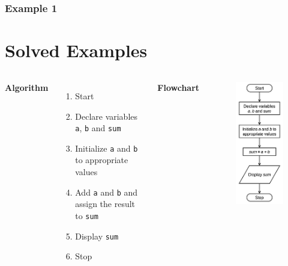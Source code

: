 \documentclass{beamer}
\begin{document}
\begin{frame}[fragile]
    \frametitle{Example 1}
    \section{Solved Examples} %
    \label{sec:solved}
    \begin{columns}
    \textbf{Algorithm}
    \begin{enumerate}
        \item Start
        \item Declare variables \texttt{a}, \texttt{b} and \texttt{sum}
        \item Initialize \texttt{a} and \texttt{b} to appropriate values
        \item Add \texttt{a} and \texttt{b} and assign the result to \texttt{sum}
        \item Display \texttt{sum}
        \item Stop
    \end{enumerate}
    \textbf{Flowchart}
    \begin{figure}
        \centering
        \includegraphics[scale=0.55]{p1flow}
    \end{figure}
    \end{columns}
\end{frame}
\end{document}
